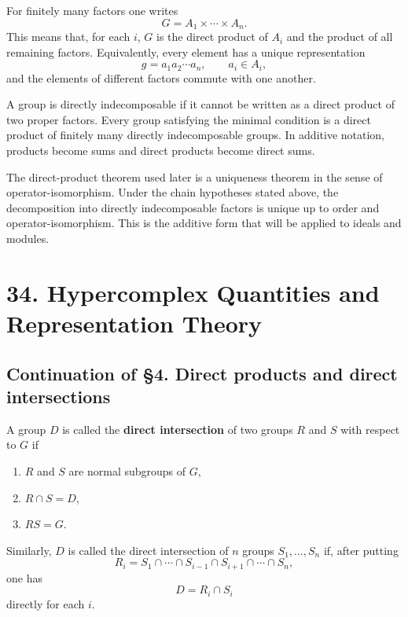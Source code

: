 \documentclass[11pt]{article}
\begin{document}
For finitely many factors one writes \[
  G=A_1\times\cdots\times A_n.
\] This means that, for each \(i\), \(G\) is the direct product of
\(A_i\) and the product of all remaining factors. Equivalently, every
element has a unique representation \[
  g=a_1a_2\cdots a_n,
  \qquad a_i\in A_i,
\] and the elements of different factors commute with one another.

A group is directly indecomposable if it cannot be written as a direct
product of two proper factors. Every group satisfying the minimal
condition is a direct product of finitely many directly indecomposable
groups. In additive notation, products become sums and direct products
become direct sums.

The direct-product theorem used later is a uniqueness theorem in the
sense of operator-isomorphism. Under the chain hypotheses stated above,
the decomposition into directly indecomposable factors is unique up to
order and operator-isomorphism. This is the additive form that will be
applied to ideals and modules.

\clearpage

\section{34. Hypercomplex Quantities and Representation
Theory}\label{hypercomplex-quantities-and-representation-theory}

\subsection{Continuation of §4. Direct products and direct
intersections}\label{continuation-of-4.-direct-products-and-direct-intersections}

A group \(D\) is called the \textbf{direct intersection} of two groups
\(R\) and \(S\) with respect to \(G\) if

\begin{enumerate}
\def\labelenumi{\alph{enumi})}
\item
  \(R\) and \(S\) are normal subgroups of \(G\),
\item
  \(R\cap S=D\),
\item
  \(RS=G\).
\end{enumerate}

Similarly, \(D\) is called the direct intersection of \(n\) groups
\(S_1,\ldots,S_n\) if, after putting \[
  R_i=S_1\cap\cdots\cap S_{i-1}\cap S_{i+1}\cap\cdots\cap S_n,
\] one has \[
  D=R_i\cap S_i
\] directly for each \(i\).
\end{document}
